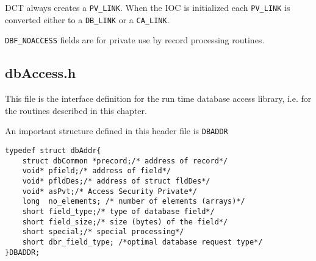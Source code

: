 DCT always creates a \verb|PV_LINK|. When the IOC is initialized each \verb|PV_LINK| is converted either to a \verb|DB_LINK| or a 
\verb|CA_LINK|.

\verb|DBF_NOACCESS| fields are for private use by record processing routines.

\subsection{dbAccess.h}

This file is the interface definition for the run time database access library, i.e. for the routines described in this chapter.

An important structure defined in this header file is \verb|DBADDR| 

\begin{verbatim}
typedef struct dbAddr{
    struct dbCommon *precord;/* address of record*/
    void* pfield;/* address of field*/
    void* pfldDes;/* address of struct fldDes*/
    void* asPvt;/* Access Security Private*/
    long  no_elements; /* number of elements (arrays)*/
    short field_type;/* type of database field*/
    short field_size;/* size (bytes) of the field*/
    short special;/* special processing*/
    short dbr_field_type; /*optimal database request type*/
}DBADDR;
\end{verbatim}
